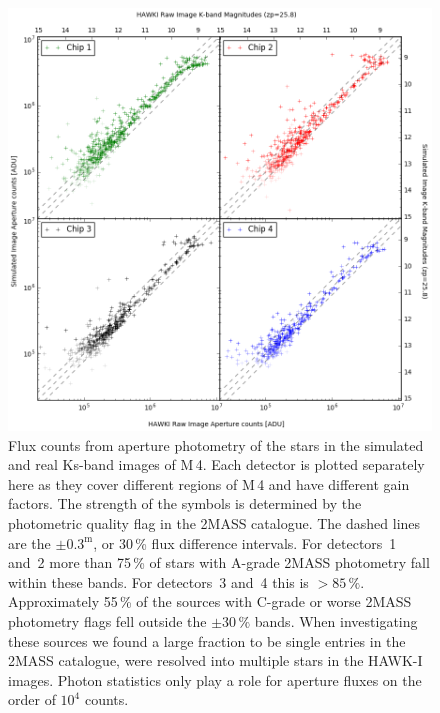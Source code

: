 \begin{figure}

    \centering
    \includegraphics[width=\textwidth]{images/HAWKI_vs_HAWKado_couts_and_mags.png}
    
    \caption{Flux counts from aperture photometry of the stars in the simulated and real Ks-band images of M\,4. Each detector is plotted separately here as they cover different regions of M\,4 and have different gain factors. The strength of the symbols is determined by the photometric quality flag in the 2MASS catalogue. The dashed lines are the $\pm 0.3^\mathrm{m}$, or 30\,\% flux difference intervals. For detectors~1 and~2  more than 75\,\% of stars with A-grade 2MASS photometry fall within these bands. For detectors~3 and~4 this is $>85\,\%$. Approximately 55\,\% of the sources with C-grade or worse 2MASS photometry flags fell outside the $\pm 30\,\%$ bands. When investigating these sources we found a large fraction to be single entries in the 2MASS catalogue, were resolved into multiple stars in the HAWK-I images. Photon statistics only play a role for aperture fluxes on the order of $10^{4}$ counts.}
    \label{fig:HAWKI_hawkado_flux_comparison}
    
\end{figure}

